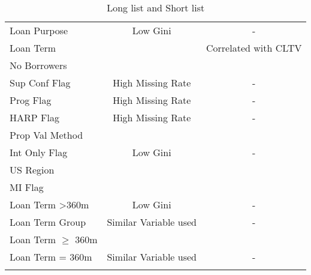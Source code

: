 \begin{longtable}{ l c c }
Loan Purpose                & \cellcolor[HTML]{F7D9E1}Low Gini                             & -                                            \\
Loan Term                   & \cellcolor[HTML]{C0F0C0}                                     & \cellcolor[HTML]{F7D9E1}Correlated with CLTV \\
No Borrowers                & \cellcolor[HTML]{C0F0C0}                                     & \cellcolor[HTML]{C0F0C0}                     \\
Sup Conf Flag               & \cellcolor[HTML]{F7D9E1}High Missing Rate                    & -                                            \\
Prog Flag                   & \cellcolor[HTML]{F7D9E1}High Missing Rate                    & -                                            \\
HARP Flag                   & \cellcolor[HTML]{F7D9E1}High Missing Rate                    & -                                            \\
Prop Val Method             & \cellcolor[HTML]{C0F0C0}                                     & \cellcolor[HTML]{C0F0C0}                     \\
Int Only Flag               & \cellcolor[HTML]{F7D9E1}Low Gini                             & -                                            \\
US Region                   & \cellcolor[HTML]{C0F0C0}                                     & \cellcolor[HTML]{C0F0C0}                     \\
MI Flag                     & \cellcolor[HTML]{C0F0C0}                                     & \cellcolor[HTML]{C0F0C0}                     \\
Loan Term \textgreater 360m & \cellcolor[HTML]{F7D9E1}Low Gini                             & -                                            \\
Loan Term Group             & \cellcolor[HTML]{F7D9E1}Similar Variable used                & -                                            \\
Loan Term $\geq$ 360m       & \cellcolor[HTML]{C0F0C0}                                     & \cellcolor[HTML]{C0F0C0}                     \\
Loan Term = 360m            & \cellcolor[HTML]{F7D9E1}Similar Variable used                & -                                           \\\bottomrule
\caption{Long list and Short list}
\label{tab:re_ll_sl}       
\end{longtable}

